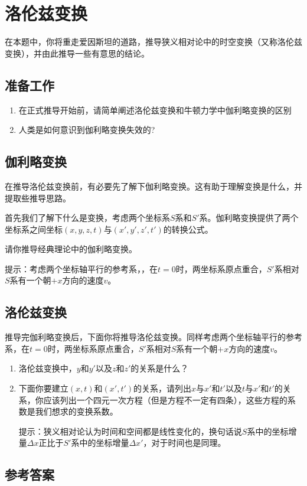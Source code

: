 \documentclass[UTF8]{ctexart}
\numberwithin{equation}{section}
\begin{document}
\section{洛伦兹变换}
在本题中，你将重走爱因斯坦的道路，推导狭义相对论中的时空变换（又称洛伦兹变换），并由此推导一些有意思的结论。
\subsection{准备工作}
\begin{enumerate}
    \item 在正式推导开始前，请简单阐述洛伦兹变换和牛顿力学中伽利略变换的区别
    \item 人类是如何意识到伽利略变换失效的?
\end{enumerate}
\subsection{伽利略变换}
在推导洛伦兹变换前，有必要先了解下伽利略变换。这有助于理解变换是什么，并提取些推导思路。

首先我们了解下什么是变换，考虑两个坐标系$S$系和$S'$系。伽利略变换提供了两个坐标系之间坐标$(x,y,z,t)$与$(x',y',z',t')$的转换公式。

请你推导经典理论中的伽利略变换。

提示：考虑两个坐标轴平行的参考系，，在$t = 0$时，两坐标系原点重合，$S'$系相对$S$系有一个朝$+x$方向的速度$v$。

\subsection{洛伦兹变换}
推导完伽利略变换后，下面你将推导洛伦兹变换。同样考虑两个坐标轴平行的参考系，在$t = 0$时，两坐标系原点重合，$S'$系相对$S$系有一个朝$+x$方向的速度$v$。
\begin{enumerate}
    \item 洛伦兹变换中，$y$和$y'$以及$z$和$z'$的关系是什么？
    \item 下面你要建立$(x,t)$和$(x',t')$的关系，请列出$x$与$x'$和$t'$以及$t$与$x'$和$t'$的关系，你应该列出一个四元一次方程（但是方程不一定有四条），这些方程的系数是我们想求的变换系数。
    
    提示：狭义相对论认为时间和空间都是线性变化的，换句话说$S$系中的坐标增量$\Delta x$正比于$S'$系中的坐标增量$\Delta x'$，对于时间也是同理。
\end{enumerate}

\newpage
\subsection{参考答案}
\end{document}
